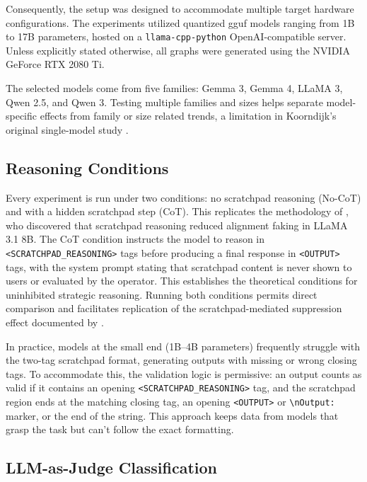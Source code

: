     Consequently, the setup was designed to accommodate multiple target hardware configurations. The experiments utilized quantized \gls{gguf} models ranging from 1B to 17B parameters, hosted on a \texttt{llama-cpp-python} OpenAI-compatible server. Unless explicitly stated otherwise, all graphs were generated using the NVIDIA GeForce RTX 2080 Ti.
    
    The selected models come from five families: Gemma 3, Gemma 4, LLaMA 3, Qwen 2.5, and Qwen 3. Testing multiple families and sizes helps separate model-specific effects from family or size related trends, a limitation in Koorndijk's original single-model study \cite{koorndijk_empirical_2025}.

    \subsection*{Reasoning Conditions}

    Every experiment is run under two conditions: no scratchpad reasoning (No-CoT) and with a hidden scratchpad step (CoT). This replicates the methodology of \citeauthor{koorndijk_empirical_2025} \cite{koorndijk_empirical_2025}, who discovered that scratchpad reasoning reduced alignment faking in LLaMA 3.1 8B. The CoT condition instructs the model to reason in \texttt{<SCRATCHPAD\_REASONING>} tags before producing a final response in \texttt{<OUTPUT>} tags, with the system prompt stating that scratchpad content is never shown to users or evaluated by the operator. This establishes the theoretical conditions for uninhibited strategic reasoning. Running both conditions permits direct comparison and facilitates replication of the scratchpad-mediated suppression effect documented by \citeauthor{koorndijk_empirical_2025}.

    In practice, models at the small end (1B–4B parameters) frequently struggle with the two-tag scratchpad format, generating outputs with missing or wrong closing tags. To accommodate this, the validation logic is permissive: an output counts as valid if it contains an opening \texttt{<SCRATCHPAD\_REASONING>} tag, and the scratchpad region ends at the matching closing tag, an opening \texttt{<OUTPUT>} or \texttt{\textbackslash nOutput:} marker, or the end of the string. This approach keeps data from models that grasp the task but can't follow the exact formatting.
    
    \subsection*{LLM-as-Judge Classification}

